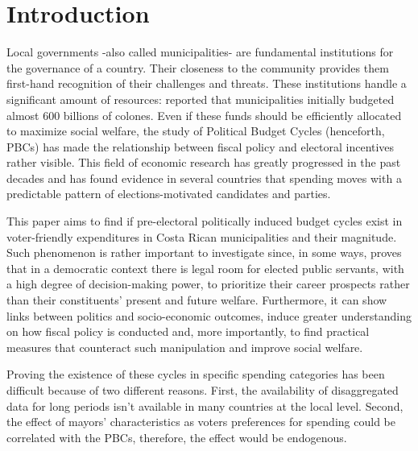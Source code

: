 \newpage
\setcounter{page}{1}

\section{Introduction}

Local governments -also called municipalities- are fundamental institutions for the governance of a country. Their closeness to the community provides them first-hand recognition of their challenges and threats. These institutions handle a significant amount of resources: \textcite{cgr2020} reported that municipalities initially budgeted almost 600 billions of colones. Even if these funds should be efficiently allocated to maximize social welfare, the study of Political Budget Cycles (henceforth, PBCs) has made the relationship between fiscal policy and electoral incentives rather visible. This field of economic research has greatly progressed in the past decades and has found evidence in several countries that spending moves with a predictable pattern of elections-motivated candidates and parties. \parencite{chortareas2016,drazen2010}

This paper aims to find if pre-electoral politically induced budget cycles exist in voter-friendly expenditures in Costa Rican municipalities and their magnitude. Such phenomenon is rather important to investigate since, in some ways, proves that in a democratic context there is legal room for elected public servants, with a high degree of decision-making power, to prioritize their career prospects rather than their constituents' present and future welfare. Furthermore, it can show links between politics and socio-economic outcomes, induce greater understanding on how fiscal policy is conducted and, more importantly, to find practical measures that counteract such manipulation and improve social welfare. \parencite{alesina2018,chortareas2016}

Proving the existence of these cycles in specific spending categories has been difficult because of two different reasons.  First, the availability of disaggregated data for long periods isn’t available in many countries at the local level. Second, the effect of mayors’ characteristics as voters preferences for spending could be correlated with the PBCs, therefore, the effect would be endogenous. 

